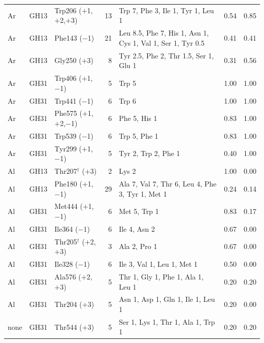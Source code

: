 \documentclass[preprint,12pt]{elsarticle}
\begin{document}
\begin{table}[p]
\begin{tabular}{lllrp{4.6cm}rr}
Ar & GH13 & Trp206 ($+$1,$+$2,$+$3) & 13 & Trp 7, Phe 3, Ile 1, Tyr 1, Leu 1 & 0.54 & 0.85\\
Ar & GH13 & Phe143 ($-$1) & 21 & Leu 8.5, Phe 7, His 1, Asn 1, Cys 1, Val 1, Ser 1, Tyr 0.5 & 0.41 & 0.41\\
Ar & GH13 & Gly250 ($+$3) & 8 & Tyr 2.5, Phe 2, Thr 1.5, Ser 1, Glu 1 & 0.31 & 0.56\\
Ar & GH31 & Trp406 ($+$1,$-$1) & 5 & Trp 5 & 1.00 & 1.00\\
Ar & GH31 & Trp441 ($-$1) & 6 & Trp 6 & 1.00 & 1.00\\
Ar & GH31 & Phe575 ($+$1,$+$2,$-$1) & 6 & Phe 5, His 1 & 0.83 & 1.00\\
Ar & GH31 & Trp539 ($-$1) & 6 & Trp 5, Phe 1 & 0.83 & 1.00\\
Ar & GH31 & Tyr299 ($+$1,$-$1) & 5 & Tyr 2, Trp 2, Phe 1 & 0.40 & 1.00\\
\midrule
Al & GH13 & Thr207$^\dagger$ ($+$3) & 2 & Lys 2 & 1.00 & 0.00\\
Al & GH13 & Phe180 ($+$1,$-$1) & 29 & Ala 7, Val 7, Thr 6, Leu 4, Phe 3, Tyr 1, Met 1 & 0.24 & 0.14\\
Al & GH31 & Met444 ($+$1,$-$1) & 6 & Met 5, Trp 1 & 0.83 & 0.17\\
Al & GH31 & Ile364 ($-$1) & 6 & Ile 4, Asn 2 & 0.67 & 0.00\\
Al & GH31 & Thr205$^\dagger$ ($+$2,$+$3) & 3 & Ala 2, Pro 1 & 0.67 & 0.00\\
Al & GH31 & Ile328 ($-$1) & 6 & Ile 3, Val 1, Leu 1, Met 1 & 0.50 & 0.00\\
Al & GH31 & Ala576 ($+$2,$+$3) & 5 & Thr 1, Gly 1, Phe 1, Ala 1, Leu 1 & 0.20 & 0.20\\
Al & GH31 & Thr204 ($+$3) & 5 & Asn 1, Asp 1, Gln 1, Ile 1, Leu 1 & 0.20 & 0.00\\
\midrule
none & GH31 & Thr544 ($+$3) & 5 & Ser 1, Lys 1, Thr 1, Ala 1, Trp 1 & 0.20 & 0.20\\
\bottomrule
\end{tabular}
\end{table}
\end{document}
